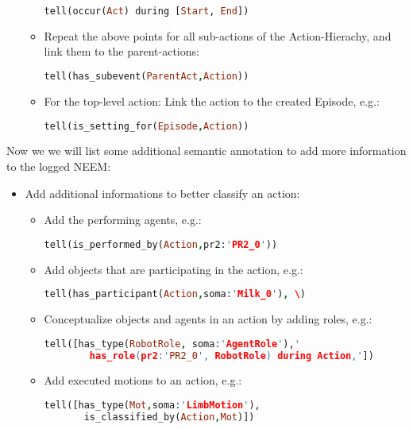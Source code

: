 \begin{itemize}
\begin{itemize}
\begin{lstlisting}[language=Prolog]
tell(occur(Act) during [Start, End])
			\end{lstlisting}
		\item Repeat the above points for all sub-actions of the Action-Hierachy, and link them to the parent-actions:
			\begin{lstlisting}[language=Prolog]
tell(has_subevent(ParentAct,Action))
			\end{lstlisting}
		\item For the top-level action: Link the action to the created Episode, e.g.: 
			\begin{lstlisting}[language=Prolog]
tell(is_setting_for(Episode,Action))
			\end{lstlisting}
	\end{itemize}
\end{itemize}

Now we we will list some additional semantic annotation to add more information to the logged NEEM:

\begin{itemize}
	\item Add additional informations to better classify an action: 
	\begin{itemize}
		\item Add the performing agents, e.g.:
			\begin{lstlisting}[language=Prolog]
tell(is_performed_by(Action,pr2:'PR2_0'))
			\end{lstlisting}
		\item Add objects that are participating in the action, e.g.:
			\begin{lstlisting}[language=Prolog]
tell(has_participant(Action,soma:'Milk_0'), \)
			\end{lstlisting}
		\item Conceptualize objects and agents in an action by adding roles, e.g.:
			\begin{lstlisting}[language=Prolog]
tell([has_type(RobotRole, soma:'AgentRole'),' 
		has_role(pr2:'PR2_0', RobotRole) during Action,'])
			\end{lstlisting}
		\item Add executed motions to an action, e.g.:
			\begin{lstlisting}[language=Prolog]
tell([has_type(Mot,soma:'LimbMotion'),
       is_classified_by(Action,Mot)])
			\end{lstlisting}
	\end{itemize}
\end{itemize}

